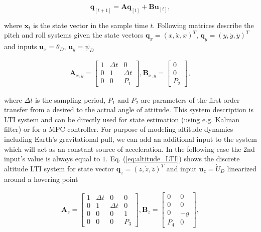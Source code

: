 \begin{equation}
\mathbf{q}_{[t+1]} = \mathbf{A}\mathbf{q}_{[t]}+ \mathbf{B}\mathbf{u}_{[t]},
\label{eq:lti_state_space}
\end{equation}

where $\mathbf{x}_{t}$ is the state vector in the sample time $t$. Following matrices describe the pitch and roll systems given the state vectors $\mathbf{q}_{x} = \left(x, \dot{x}, \ddot{x}\right)^T$, $\mathbf{q}_{y} = \left(y, \dot{y}, \ddot{y}\right)^T$ and inputs $\mathbf{u}_x = \theta_D$, $\mathbf{u}_y = \psi_D$

\begin{equation}
\begin{split}
\mathbf{A}_{x, y} = \begin{bmatrix}
1 & \Delta t & 0 \\
0 & 1 & \Delta t \\
0 & 0 & P_1
\end{bmatrix}, \mathbf{B}_{x, y} = \begin{bmatrix}
0\\
0\\
P_2
\end{bmatrix},
\end{split}
\label{eq:attitude_LTI}
\end{equation}

where $\Delta t$ is the sampling period, $P_1$ and $P_2$ are parameters of the first order transfer from a desired to the actual angle of attitude. This system description is LTI system and can be directly used for state estimation (using e.g. Kalman filter) or for a MPC controller. For purpose of modeling altitude dynamics including Earth's gravitational pull, we can add an additional input to the system which will act as an constant source of acceleration. In the following case the 2nd input's value is always equal to $1$. Eq. (\ref{eq:altitude_LTI}) shows the discrete altitude LTI system for state vector $\mathbf{q}_{z} = \left(z, \dot{z}, \ddot{z}\right)^T$ and input $\mathbf{u}_z = \dot{U}_D$ linearized around a hovering point

\begin{equation}
\begin{split}
\mathbf{A}_{z} = \begin{bmatrix}
1 & \Delta t & 0 & 0\\
0 & 1 & \Delta t & 0\\
0 & 0 & 0 & 1 \\
0 & 0 & 0 & P_3
\end{bmatrix}, \mathbf{B}_{z} = \begin{bmatrix}
0 & 0\\
0 & 0\\
0 & -g\\
P_4 & 0
\end{bmatrix},
\end{split}
\label{eq:altitude_LTI}
\end{equation}

